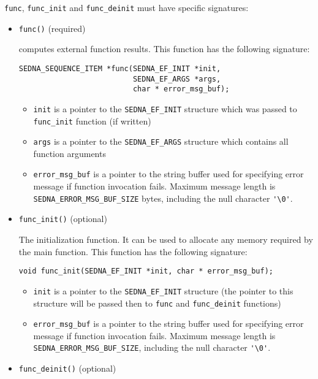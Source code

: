 \documentclass[a4paper,12pt]{article}
\begin{document}
\verb!func!, \verb!func_init! and \verb!func_deinit! must have specific signatures:
\begin{itemize}
\item \verb!func()! (required)

computes external function results.
This function has the following signature:
\begin{verbatim}
SEDNA_SEQUENCE_ITEM *func(SEDNA_EF_INIT *init,
                          SEDNA_EF_ARGS *args,
                          char * error_msg_buf);
\end{verbatim}
\begin{itemize}
	\item \verb!init! is a pointer to the \verb!SEDNA_EF_INIT! structure which
		was passed to \verb!func_init! function (if written)
	\item \verb!args! is a pointer to the \verb!SEDNA_EF_ARGS! structure which
		contains all function arguments
	\item \verb!error_msg_buf! is a pointer to the string buffer used for specifying error
		message if function invocation fails. Maximum message length is
		\verb!SEDNA_ERROR_MSG_BUF_SIZE! bytes, including the null character \verb!'\0'!.
\end{itemize}

\item \verb!func_init()! (optional)

The initialization function.
It can be used to allocate any memory required by the main function.
This function has the following signature:
\begin{verbatim}
void func_init(SEDNA_EF_INIT *init, char * error_msg_buf);
\end{verbatim}
\begin{itemize}
	\item \verb!init! is a pointer to the \verb!SEDNA_EF_INIT! structure
		(the pointer to this structure will be passed then to \verb!func! and
		\verb!func_deinit! functions)
	\item \verb!error_msg_buf! is a pointer to the string buffer used for specifying error
		message if function invocation fails. Maximum message length is
		\verb!SEDNA_ERROR_MSG_BUF_SIZE!, including the null character \verb!'\0'!.
\end{itemize}

\item \verb!func_deinit()! (optional)


\end{itemize}
\end{document}
